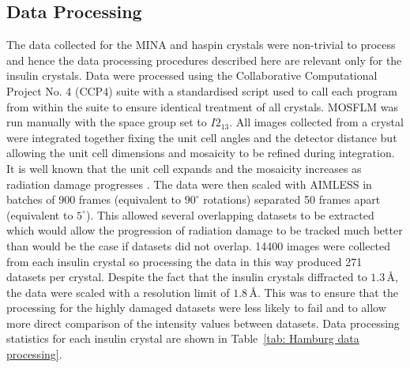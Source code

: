 \subsection{Data Processing}
\label{sub:Data Processing}
The data collected for the MINA and haspin crystals were non-trivial to process and hence the data processing procedures described here are relevant only for the insulin crystals.
Data were processed using the Collaborative Computational Project No. 4 (CCP4) suite \cite{winn2011} with a standardised script used to call each program from within the suite to ensure identical treatment of all crystals.
MOSFLM \cite{leslie2007} was run manually with the space group set to $I2_13$.
All images collected from a crystal were integrated together fixing the unit cell angles and the detector distance but allowing the unit cell dimensions and mosaicity to be refined during integration.
It is well known that the unit cell expands and the mosaicity increases as radiation damage progresses \cite{garman2010}.
The data were then scaled with AIMLESS \cite{evans2013} in batches of 900 frames (equivalent to $90^{\circ}$ rotations) separated 50 frames apart (equivalent to $5^{\circ}$).
This allowed several overlapping datasets to be extracted which would allow the progression of radiation damage to be tracked much better than would be the case if datasets did not overlap.
14400 images were collected from each insulin crystal so processing the data in this way produced 271 datasets per crystal.
Despite the fact that the insulin crystals diffracted to $1.3\,$\AA, the data were scaled with a resolution limit of $1.8\,$\AA.
This was to ensure that the processing for the highly damaged datasets were less likely to fail and to allow more direct comparison of the intensity values between datasets.
Data processing statistics for each insulin crystal are shown in Table~\ref{tab: Hamburg data processing}.

